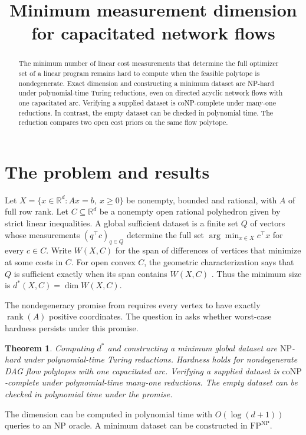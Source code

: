 \documentclass[11pt,a4paper]{amsart}
\title[Minimum measurement dimension for network flows]{Minimum measurement dimension for capacitated network flows}
\date{}
\newtheorem{theorem}{Theorem}
\newcommand{\R}{\mathbb R}
\newcommand{\NP}{\mathrm{NP}}
\newcommand{\coNP}{\mathrm{coNP}}
\newcommand{\FP}{\mathrm{FP}}
\begin{document}
\begin{abstract}
The minimum number of linear cost measurements that determine the full optimizer set of a linear program remains hard to compute when the feasible polytope is nondegenerate. Exact dimension and constructing a minimum dataset are NP-hard under polynomial-time Turing reductions, even on directed acyclic network flows with one capacitated arc. Verifying a supplied dataset is coNP-complete under many-one reductions. In contrast, the empty dataset can be checked in polynomial time. The reduction compares two open cost priors on the same flow polytope.
\end{abstract}
\maketitle

\section{The problem and results}
Let $X=\{x\in\R^d:Ax=b,\ x\geq0\}$ be nonempty, bounded and rational, with $A$ of full row rank. Let $C\subseteq\R^d$ be a nonempty open rational polyhedron given by strict linear inequalities. A global sufficient dataset is a finite set $Q$ of vectors whose measurements $(q^\top c)_{q\in Q}$ determine the full set $\arg\min_{x\in X}c^\top x$ for every $c\in C$. Write $W(X,C)$ for the span of differences of vertices that minimize at some costs in $C$. For open convex $C$, the geometric characterization \cite[Corollary 1]{bennouna} says that $Q$ is sufficient exactly when its span contains $W(X,C)$ \cite[Corollary 4]{ye}. Thus the minimum size is $d^*(X,C)=\dim W(X,C)$.

The nondegeneracy promise from \cite[Assumption 12]{ye} requires every vertex to have exactly $\operatorname{rank}(A)$ positive coordinates. The question in \cite[\S7]{ye} asks whether worst-case hardness persists under this promise.

\begin{theorem}
Computing $d^*$ and constructing a minimum global dataset are $\NP$-hard under polynomial-time Turing reductions. Hardness holds for nondegenerate DAG flow polytopes with one capacitated arc. Verifying a supplied dataset is $\coNP$-complete under polynomial-time many-one reductions. The empty dataset can be checked in polynomial time under the promise.
\end{theorem}

The dimension can be computed in polynomial time with $O(\log(d+1))$ queries to an $\NP$ oracle. A minimum dataset can be constructed in $\FP^{\NP}$.
\end{document}
